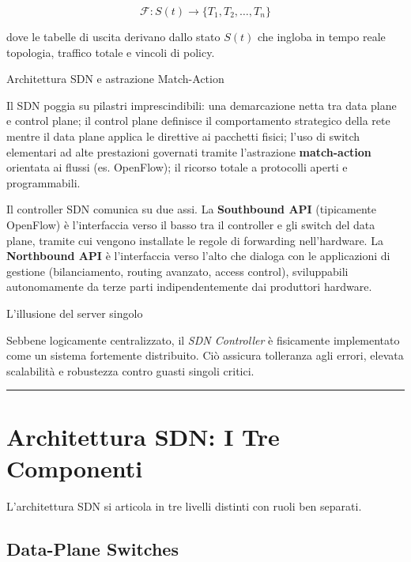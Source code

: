 \documentclass[
  italian,
  openany]{book}
\begin{document}
\[
\mathcal{F}: S(t) \rightarrow \{T_1, T_2, \ldots, T_n\}
\]

dove le tabelle di uscita derivano dallo stato \(S(t)\) che ingloba in
tempo reale topologia, traffico totale e vincoli di policy.

\begin{calloutimportant}{Architettura SDN e astrazione Match-Action}

Il SDN poggia su pilastri imprescindibili: una demarcazione netta tra
data plane e control plane; il control plane definisce il comportamento
strategico della rete mentre il data plane applica le direttive ai
pacchetti fisici; l'uso di switch elementari ad alte prestazioni
governati tramite l'astrazione \textbf{match-action} orientata ai flussi
(es. OpenFlow); il ricorso totale a protocolli aperti e programmabili.

\end{calloutimportant}

Il controller SDN comunica su due assi. La \textbf{Southbound API}
(tipicamente OpenFlow) è l'interfaccia verso il basso tra il controller
e gli switch del data plane, tramite cui vengono installate le regole di
forwarding nell'hardware. La \textbf{Northbound API} è l'interfaccia
verso l'alto che dialoga con le applicazioni di gestione (bilanciamento,
routing avanzato, access control), sviluppabili autonomamente da terze
parti indipendentemente dai produttori hardware.

\begin{calloutwarning}{L’illusione del server singolo}

Sebbene logicamente centralizzato, il \emph{SDN Controller} è
fisicamente implementato come un sistema fortemente distribuito. Ciò
assicura tolleranza agli errori, elevata scalabilità e robustezza contro
guasti singoli critici.

\end{calloutwarning}

\begin{center}\rule{0.5\linewidth}{0.5pt}\end{center}

\section{Architettura SDN: I Tre
Componenti}\label{architettura-sdn-i-tre-componenti}

L'architettura SDN si articola in tre livelli distinti con ruoli ben
separati.

\subsection{Data-Plane Switches}\label{data-plane-switches}
\end{document}

